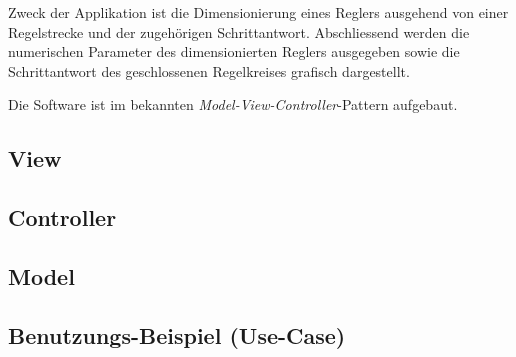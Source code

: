 
Zweck  der Applikation  ist die  Dimensionierung eines  Reglers ausgehend  von
einer Regelstrecke und  der zugeh\"origen Schrittantwort. Abschliessend werden
die  numerischen Parameter  des dimensionierten  Reglers ausgegeben  sowie die
Schrittantwort des geschlossenen Regelkreises grafisch dargestellt.

Die   Software    ist   im    bekannten   \emph{Model-View-Controller}-Pattern
aufgebaut.


\subsection{View}



\subsection{Controller}



\subsection{Model}



\subsection{Benutzungs-Beispiel (Use-Case)}

